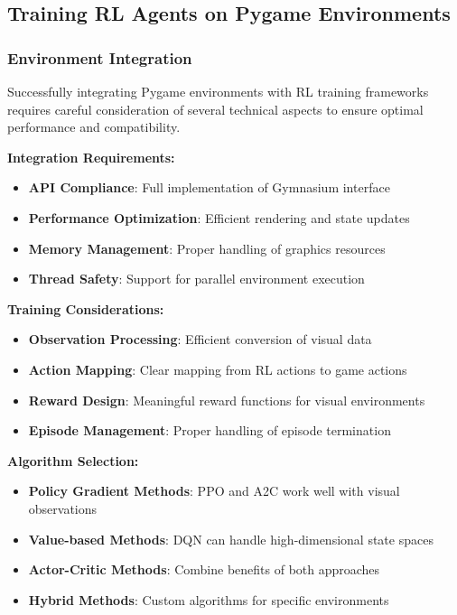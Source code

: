 \documentclass[12pt]{article}
\begin{document}
{{{\subsection{Training RL Agents on Pygame Environments}

\subsubsection{Environment Integration}

Successfully integrating Pygame environments with RL training frameworks requires careful consideration of several technical aspects to ensure optimal performance and compatibility.

\textbf{Integration Requirements:}
\begin{itemize}
    \item \textbf{API Compliance}: Full implementation of Gymnasium interface
    \item \textbf{Performance Optimization}: Efficient rendering and state updates
    \item \textbf{Memory Management}: Proper handling of graphics resources
    \item \textbf{Thread Safety}: Support for parallel environment execution
\end{itemize}

\textbf{Training Considerations:}
\begin{itemize}
    \item \textbf{Observation Processing}: Efficient conversion of visual data
    \item \textbf{Action Mapping}: Clear mapping from RL actions to game actions
    \item \textbf{Reward Design}: Meaningful reward functions for visual environments
    \item \textbf{Episode Management}: Proper handling of episode termination
\end{itemize}

\textbf{Algorithm Selection:}
\begin{itemize}
    \item \textbf{Policy Gradient Methods}: PPO and A2C work well with visual observations
    \item \textbf{Value-based Methods}: DQN can handle high-dimensional state spaces
    \item \textbf{Actor-Critic Methods}: Combine benefits of both approaches
    \item \textbf{Hybrid Methods}: Custom algorithms for specific environments
\end{itemize}

}}}
\end{document}
